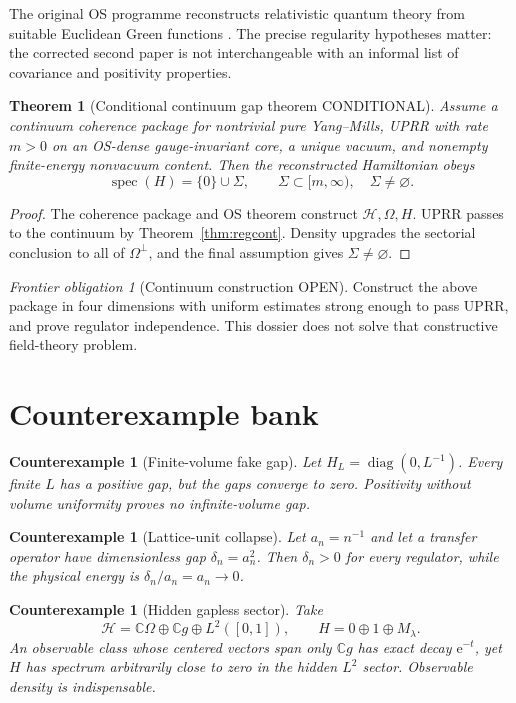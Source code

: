 \documentclass[11pt]{article}
\newcommand{\Cstatus}{\textcolor{conditional}{\textsf{CONDITIONAL}}}
\newcommand{\Ostatus}{\textcolor{open}{\textsf{OPEN}}}
\newcommand{\spec}{\operatorname{spec}}
\newcommand{\e}{\mathrm e}
\newtheorem{theorem}[definition]{Theorem}
\newtheorem{counterexample}[definition]{Counterexample}
\theoremstyle{remark}
\newtheorem{obligation}[definition]{Frontier obligation}
\begin{document}
The original OS programme reconstructs relativistic quantum theory from
suitable Euclidean Green functions \cite{OS1,OS2}.  The precise regularity
hypotheses matter: the corrected second paper is not interchangeable with an
informal list of covariance and positivity properties.

\begin{theorem}[Conditional continuum gap theorem \Cstatus]
Assume a continuum coherence package for nontrivial pure Yang--Mills, UPRR with
rate $m>0$ on an OS-dense gauge-invariant core, a unique vacuum, and nonempty
finite-energy nonvacuum content.  Then the reconstructed Hamiltonian obeys
\[
 \spec(H)=\{0\}\cup\Sigma,
 \qquad \Sigma\subset[m,\infty),\quad\Sigma\ne\varnothing.
\]
\end{theorem}

\begin{proof}
The coherence package and OS theorem construct $\mathcal H,\Omega,H$.  UPRR
passes to the continuum by Theorem~\ref{thm:regcont}.  Density upgrades the
sectorial conclusion to all of $\Omega^\perp$, and the final assumption gives
$\Sigma\ne\varnothing$.
\end{proof}

\begin{obligation}[Continuum construction \Ostatus]
Construct the above package in four dimensions with uniform estimates strong
enough to pass UPRR, and prove regulator independence.  This dossier does not
solve that constructive field-theory problem.
\end{obligation}

\section{Counterexample bank}

\begin{counterexample}[Finite-volume fake gap]
Let $H_L=\operatorname{diag}(0,L^{-1})$.  Every finite $L$ has a positive gap,
but the gaps converge to zero.  Positivity without volume uniformity proves no
infinite-volume gap.
\end{counterexample}

\begin{counterexample}[Lattice-unit collapse]
Let $a_n=n^{-1}$ and let a transfer operator have dimensionless gap
$\delta_n=a_n^2$.  Then $\delta_n>0$ for every regulator, while the physical
energy is $\delta_n/a_n=a_n\to0$.
\end{counterexample}

\begin{counterexample}[Hidden gapless sector]
Take
\[
 \mathcal H=\mathbb C\Omega\oplus\mathbb C g\oplus L^2([0,1]),
 \qquad H=0\oplus1\oplus M_\lambda.
\]
An observable class whose centered vectors span only $\mathbb Cg$ has exact
decay $\e^{-t}$, yet $H$ has spectrum arbitrarily close to zero in the hidden
$L^2$ sector.  Observable density is indispensable.
\end{counterexample}
\end{document}
